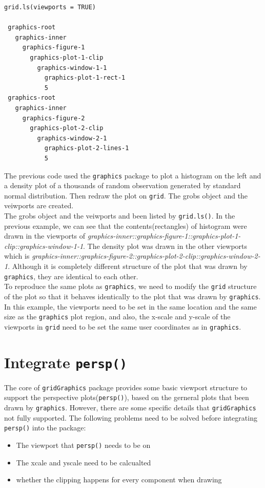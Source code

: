 \documentclass[paper=a4, fontsize=11pt]{report}
\begin{document}
\newpage
\begin{lstlisting}
grid.ls(viewports = TRUE)

 graphics-root
   graphics-inner
     graphics-figure-1
       graphics-plot-1-clip
         graphics-window-1-1
           graphics-plot-1-rect-1
           5
 graphics-root
   graphics-inner
     graphics-figure-2
       graphics-plot-2-clip
         graphics-window-2-1
           graphics-plot-2-lines-1
           5

\end{lstlisting}
The previous code used the \texttt{graphics} package to plot a histogram on the left and a density plot of a 
thousands of random observation generated by standard normal distribution. Then redraw the plot on \texttt{grid}. The grobs object and the veiwports are created. \\

The grobs object and the veiwports and been listed by \texttt{grid.ls()}. In the previous example, we can see that the contents(rectangles) of histogram were drawn in the viewports of \textit{graphics-inner::graphics-figure-1::graphics-plot-1-clip::graphics-window-1-1}. The density plot was drawn in the other viewports which is \textit{graphics-inner::graphics-figure-2::graphics-plot-2-clip::graphics-window-2-1}. Although it is completely different structure of the plot that was drawn by \texttt{graphics}, they are identical to each other.\\

To reproduce the same plots as \texttt{graphics}, we need to modify the \texttt{grid} structure of the plot so that it behaves identically to the plot that was drawn by \texttt{graphics}. In this example, the viewports need to be set in the same location and the same size as the \texttt{graphics} plot region, and also, the x-scale and y-scale of the viewports in \texttt{grid} need to be set the same user coordinates as in \texttt{graphics}.\\

\section{Integrate \texttt{persp()}}
The core of \texttt{gridGraphics} package provides some basic viewport structure to support the perspective plots(\texttt{persp()}), based on the gerneral plots that been drawn by \texttt{graphics}. However, there are some specific details that \texttt{gridGraphics} not fully supported. The following problems need to be solved before integrating \texttt{persp()} into the package:
\begin{itemize}
  \item{The viewport that \texttt{persp()} needs to be on}
  \item{The xcale and yscale need to be calcualted}
  \item{whether the clipping happens for every component when drawing}
\end{itemize}
\end{document}
